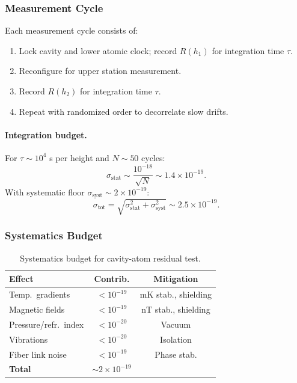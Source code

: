 \subsubsection{Measurement Cycle}

Each measurement cycle consists of:
\begin{enumerate}
\item Lock cavity and lower atomic clock; record $R(h_1)$ for integration time $\tau$.
\item Reconfigure for upper station measurement.
\item Record $R(h_2)$ for integration time $\tau$.
\item Repeat with randomized order to decorrelate slow drifts.
\end{enumerate}

\paragraph{Integration budget.}
For $\tau \sim 10^4$ s per height and $N \sim 50$ cycles:
\begin{equation}
\sigma_{\mathrm{stat}} \sim \frac{10^{-18}}{\sqrt{N}} \sim 1.4 \times 10^{-19}.
\end{equation}
With systematic floor $\sigma_{\mathrm{syst}} \sim 2 \times 10^{-19}$:
\begin{equation}
\sigma_{\mathrm{tot}} = \sqrt{\sigma_{\mathrm{stat}}^2 + \sigma_{\mathrm{syst}}^2} 
\sim 2.5 \times 10^{-19}.
\end{equation}

\subsubsection{Systematics Budget}

\begin{table}[h]
\centering
\caption{Systematics budget for cavity-atom residual test.}\label{tab:cavity-systematics}
\scriptsize
\setlength{\tabcolsep}{2pt}
\begin{tabular}{lcc}
\toprule
Effect & Contrib. & Mitigation \\
\midrule
Temp.\ gradients & $< 10^{-19}$ & mK stab., shielding \\
Magnetic fields & $< 10^{-19}$ & nT stab., shielding \\
Pressure/refr.\ index & $< 10^{-20}$ & Vacuum \\
Vibrations & $< 10^{-20}$ & Isolation \\
Fiber link noise & $< 10^{-19}$ & Phase stab. \\
\midrule
\textbf{Total} & $\sim 2 \times 10^{-19}$ & \\
\bottomrule
\end{tabular}
\end{table}

